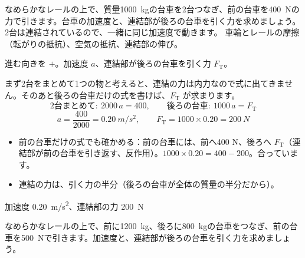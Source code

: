 \begin{phreidai}[2台の台車を引く]
\label{ph:力-2:ex6}なめらかなレールの上で、質量\qty{1000}{kg}の台車を2台つなぎ、前の台車を\qty{400}{N}の力で引きます。台車の加速度と、連結部が後ろの台車を引く力を求めましょう。
\phbamen
2台は連結されているので、一緒に同じ加速度で動きます。
\phmushi
車輪とレールの摩擦（転がりの抵抗）、空気の抵抗、連結部の伸び。
\phzu
\noindent\begin{minipage}[c]{0.56\linewidth}\centering
{}
\end{minipage}\hfill
\begin{minipage}[c]{0.41\linewidth}
進む向きを $+$。加速度 $a$、連結部が後ろの台車を引く力 $F_{\mathrm T}$。
\end{minipage}
\phriyu
まず2台をまとめて1つの物と考えると、連結の力は内力なので式に出てきません。そのあと後ろの台車だけの式を書けば、$F_{\mathrm T}$ が求まります。
\phtateru
\[ \text{2台まとめて}:\ 2000\,a=400,\qquad \text{後ろの台車}:\ 1000\,a=F_{\mathrm T} \]
\phtoku
\[ a=\frac{400}{2000}=\qty{0.20}{m/s^2},\qquad F_{\mathrm T}=1000\times0.20=\qty{200}{N} \]
\phtashikame
\begin{itemize}[leftmargin=1.2\zw, itemsep=1pt, topsep=1pt, label={\color{bkTheme}●}]
\item 前の台車だけの式でも確かめる：前の台車には、前へ400 N、後ろへ $F_{\mathrm T}$（連結部が前の台車を引き返す、反作用）。$1000\times0.20=400-200$。合っています。
\item 連結の力は、引く力の半分（後ろの台車が全体の質量の半分だから）。
\end{itemize}
\kotae 加速度 \qty{0.20}{m/s^2}、連結部の力 \qty{200}{N}
\end{phreidai}
\begin{jibun}
なめらかなレールの上で、前に\qty{1200}{kg}、後ろに\qty{800}{kg}の台車をつなぎ、前の台車を\qty{500}{N}で引きます。加速度と、連結部が後ろの台車を引く力を求めましょう。
\end{jibun}

